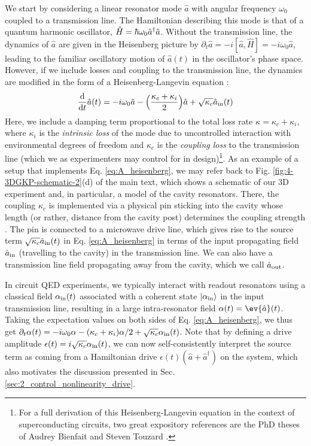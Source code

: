 We start by considering a linear resonator mode $\hat{a}$ with angular frequency $\omega_0$ coupled to a transmission line. The Hamiltonian describing this mode is that of a quantum harmonic oscillator, $\hat{H} = \hbar\omega_0 \hat{a}^\dagger \hat{a}$. Without the transmission line, the dynamics of $\hat{a}$ are given in the Heisenberg picture by $\partial_t\hat{a} = -i[\hat{a}, \hat{H}] = -i\omega_0\hat{a}$, leading to the familiar oscillatory motion of $\hat{a}(t)$ in the oscillator's phase space. However, if we include losses and coupling to the transmission line, the dynamics are modified in the form of a Heisenberg-Langevin equation \cite{walls1994quantum, gardiner2004quantum, clerk2010introduction}:
\begin{equation}
    \odv*{\hat{a}}{t}(t) = -i\omega_0\hat{a} - \Big(\frac{\kappa_c + \kappa_i}{2}\Big)\hat{a} + \sqrt{\kappa_c}\hat{a}_{\rm in}(t)
    \label{eq:A_heisenberg}
\end{equation}
Here, we include a damping term proportional to the total loss rate $\kappa = \kappa_c + \kappa_i$, where $\kappa_i$ is the \textit{intrinsic loss} of the mode due to uncontrolled interaction with environmental degrees of freedom and $\kappa_c$ is the \textit{coupling loss} to the transmission line (which we as experimenters may control for in design)\footnote{For a full derivation of this Heisenberg-Langevin equation in the context of superconducting circuits, two great expository references are the PhD theses of Audrey Bienfait \cite{bienfait2016thesis} and Steven Touzard \cite{touzard2019thesis}.}. As an example of a setup that implements Eq. \eqref{eq:A_heisenberg}, we may refer back to Fig. \ref{fig:4-3DGKP-schematic-2}(d) of the main text, which shows a schematic of our 3D experiment and, in particular, a model of the cavity resonators. There, the coupling $\kappa_c$ is implemented via a physical pin sticking into the cavity whose length (or rather, distance from the cavity post) determines the coupling strength \cite{axline2016architecture}. The pin is connected to a microwave drive line, which gives rise to the source term $\sqrt{\kappa_c}\hat{a}_{\rm in}(t)$ in Eq. \eqref{eq:A_heisenberg} in terms of the input propagating field $\hat{a}_{\rm in}$ (travelling to the cavity) in the transmission line. We can also have a transmission line field propagating away from the cavity, which we call $\hat{a}_{\rm out}$. 

In circuit QED experiments, we typically interact with readout resonators using a classical field $\alpha_{\rm in}(t)$ associated with a coherent state $\lvert\alpha_{\rm in}\rangle$ in the input transmission line, resulting in a large intra-resonator field $\alpha(t) = \ev{\hat{a}}(t)$. Taking the expectation values on both sides of Eq. \eqref{eq:A_heisenberg}, we thus get $\partial_t \alpha(t) = -i\omega_0\alpha - (\kappa_c + \kappa_i)\alpha/2 + \sqrt{\kappa_c}\alpha_{\rm in}(t)$. Note that by defining a drive amplitude $\epsilon(t) = i\sqrt{\kappa_c}\alpha_{\rm in}(t)$, we can now self-consistently interpret the source term as coming from a Hamiltonian drive $\epsilon(t)(\hat{a} + \hat{a}^\dagger)$ on the system, which also motivates the discussion presented in Sec. \ref{sec:2_control_nonlinearity_drive}. 


